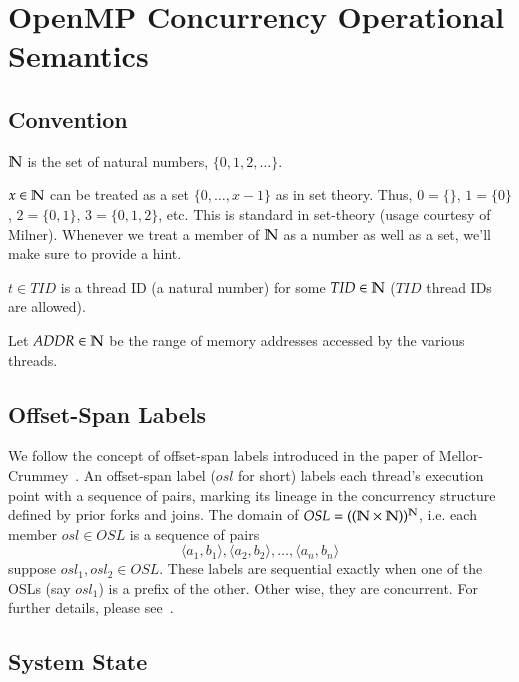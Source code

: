 \section{OpenMP Concurrency Operational Semantics}
\label{sec:appendixa}

\subsection{Convention}
\label{subsec:convention}

\begin{compactitem}
\item $\mathbb{N}$ is the set of natural numbers, $\{0,1,2,\ldots\}$.
\item $x\in\mathbb{N}$ can be treated as a set $\{0,\ldots,x-1\}$ as in set theory.
  Thus, $0=\{\}$, $1=\{0\}$, $2=\{0,1\}$, $3=\{0,1,2\}$, etc.
  This is standard in set-theory (usage courtesy of Milner).
  Whenever we treat a member of $\mathbb{N}$ as a number as well as a set, we'll make
  sure to provide a hint.
\item $t\in TID$ is a thread ID (a natural number) for some $TID\in \mathbb{N}$ ($TID$
  thread IDs are allowed).
\item Let $ADDR\in\mathbb{N}$ be the range of memory addresses accessed by the various
  threads.
\end{compactitem}

\subsection{Offset-Span Labels}
\label{subsec:osl}

We follow the concept of offset-span labels introduced in the paper of
Mellor-Crummey~\cite{Mellor-Crummey:1991:ODD:125826.125861}.
%
An offset-span label ($osl$ for short) labels each thread's execution point
with a sequence of pairs, marking its lineage in the concurrency structure
defined by prior forks and joins.
%
The domain of $OSL = ((\mathbb{N}\times\mathbb{N}))^{\mathbb{N}}$, i.e. each member $osl\in OSL$ is a
sequence of pairs
\[ \langle a_1,b_1\rangle, \langle a_2,b_2\rangle,\ldots,\langle
a_n,b_n\rangle\] suppose $osl_1, osl_2\in OSL$.
%
These labels are sequential exactly when one of the OSLs (say $osl_1$) is a
prefix of the other.
%
Other wise, they are concurrent.
%
For further details, please see~\cite{Mellor-Crummey:1991:ODD:125826.125861}.

\subsection{System State}
\label{subsec:systemstate}

